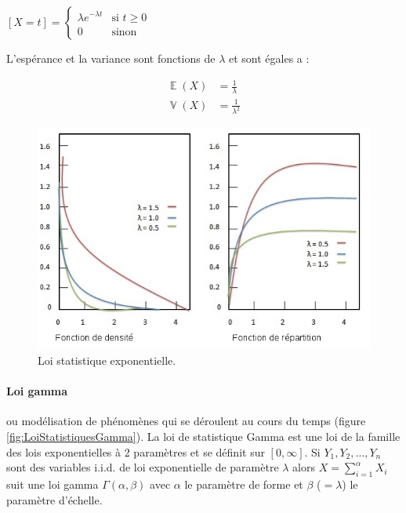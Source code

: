 \documentclass[a4paper,12pt]{report}
\DeclareMathOperator{\E}{\mathbb{E}} %
\DeclareMathOperator{\V}{\mathbb{V}} %
\theoremstyle{plain}				%
\theoremstyle{definition}				%
\begin{document}
  \begin{center}
  $[X=t] = \left\{
    \begin{array}{ll}
        \lambda e^{-\lambda t}  & \mbox{si } t \geq 0  \\
        0 & \mbox{sinon}
    \end{array}
	\right.$
  \label{definitionLoiExponentielleDensite}
  \end{center}

L’espérance et la variance sont fonctions de $\lambda$ et sont égales a :

\begin{align*}
	\E(X) &= \frac{1}{\lambda} \\
	\V(X) &= \frac{1}{\lambda ^2}
\end{align*} 


\begin{figure}
{\centering
\includegraphics[width=\columnwidth]{loiStatExponentielle.png}
\caption{Loi statistique exponentielle.}
\label{fig:LoiStatistiquesExponentielle}
\par}
\end{figure}

\paragraph{Loi gamma}
ou modélisation de phénomènes qui se déroulent au cours du temps (figure \ref{fig:LoiStatistiquesGamma}). 
La loi de statistique Gamma est une loi de la famille des lois exponentielles à 2 paramètres 
  et se définit sur $[0, \infty]$.
Si $Y_1, Y_2, \ldots, Y_n$ sont des variables i.i.d. 
  de loi exponentielle de paramètre $\lambda$ alors $X=\sum_{ i= 1}^{\alpha} X_i$  
  suit une loi gamma $\Gamma(\alpha, \beta)$ avec 
    $\alpha$ le paramètre de forme et 
    $\beta$ ($=\lambda$) le paramètre d'échelle. 
  
\end{document}
